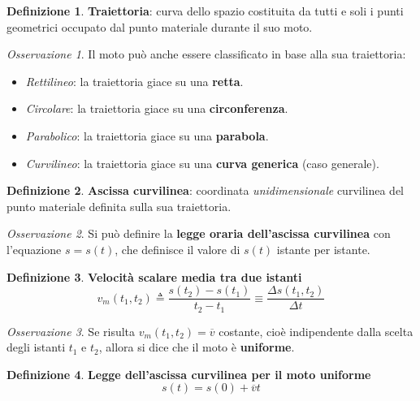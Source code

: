 \documentclass[a4paper, 12pt]{report}
\theoremstyle{definition}
\newtheorem{definition}{Definizione}[section]
\theoremstyle{remark}
\newtheorem*{remark}{Osservazione}
\theoremstyle{plain}
\begin{document}
\begin{definition}
    {\bf Traiettoria}: curva dello spazio costituita da tutti e soli i punti geometrici occupato dal punto materiale durante il suo moto.
\end{definition}

\begin{remark}
    Il moto può anche essere classificato in base alla sua traiettoria:
    \begin{itemize}
        \item {\it Rettilineo}: la traiettoria giace su una {\bf retta}.
        \item {\it Circolare}: la traiettoria giace su una {\bf circonferenza}.
        \item {\it Parabolico}: la traiettoria giace su una {\bf parabola}.
        \item {\it Curvilineo}: la traiettoria giace su una {\bf curva generica} (caso generale).
    \end{itemize}
\end{remark}

\begin{definition}
    {\bf Ascissa curvilinea}: coordinata {\it unidimensionale} curvilinea del punto materiale definita sulla sua traiettoria.
\end{definition}

\begin{remark}
    Si può definire la {\bf legge oraria dell'ascissa curvilinea} con l'equazione $s = s(t)$, che definisce il valore di $s(t)$ istante per istante.
\end{remark}

\begin{definition}
    {\bf Velocità scalare media tra due istanti}
    \begin{equation}
        v_m(t_1, t_2) \triangleq \frac{s(t_2) - s(t_1)}{t_2 - t_1} \equiv \frac{\Delta s(t_1, t_2)}{\Delta t}
    \end{equation}
\end{definition}

\begin{remark}
    Se risulta $v_m(t_1, t_2) = \overline{v}$ costante, cioè indipendente dalla scelta degli istanti $t_1$ e $t_2$, allora si dice che il moto è {\bf uniforme}.
\end{remark}

\begin{definition}
    {\bf Legge dell'ascissa curvilinea per il moto uniforme}
    \begin{equation}
        s(t) = s(0) + \overline{v}t
    \end{equation}
\end{definition}
\end{document}
